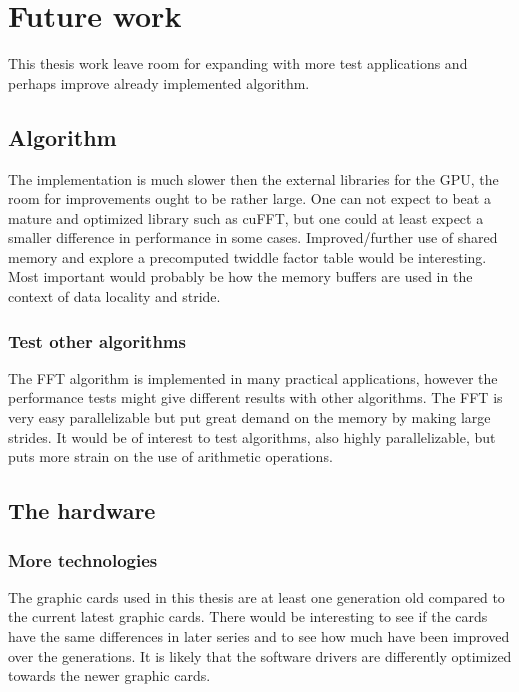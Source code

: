 \section{Future work}

This thesis work leave room for expanding with more test applications and perhaps improve already implemented algorithm.

\subsection{Algorithm}

The implementation is much slower then the external libraries for the GPU, the room for improvements ought to be rather large. One can not expect to beat a mature and optimized library such as cuFFT, but one could at least expect a smaller difference in performance in some cases. Improved/further use of shared memory and explore a precomputed twiddle factor table would be interesting. Most important would probably be how the memory buffers are used in the context of data locality and stride.

\subsubsection{Test other algorithms}

The FFT algorithm is implemented in many practical applications, however the performance tests might give different results with other algorithms. The FFT is very easy parallelizable but put great demand on the memory by making large strides. It would be of interest to test algorithms, also highly parallelizable, but puts more strain on the use of arithmetic operations.

\subsection{The hardware}

\subsubsection{More technologies}

The graphic cards used in this thesis are at least one generation old compared to the current latest graphic cards. There would be interesting to see if the cards have the same differences in later series and to see how much have been improved over the generations. It is likely that the software drivers are differently optimized towards the newer graphic cards.

